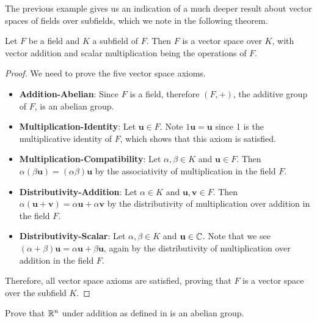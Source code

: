 The previous example gives us an indication of a much deeper result about vector spaces of fields over subfields, which we note in the following theorem.

\begin{theorem}\label{thrm-field-is-vector-space}
    Let $F$ be a field and $K$ a subfield of $F$. Then $F$ is a vector space over $K$, with vector addition and scalar multiplication being the operations of $F$.
\end{theorem}
\begin{proof}
    We need to prove the five vector space axioms.
    \begin{itemize}
        \item \textbf{Addition-Abelian}: Since $F$ is a field, therefore $(F, +)$, the additive group of $F$, is an abelian group.

        \item \textbf{Multiplication-Identity}: Let $\textbf{u} \in F$. Note $1\textbf{u} = \textbf{u}$ since 1 is the multiplicative identity of $F$, which shows that this axiom is satisfied.

        \item \textbf{Multiplication-Compatibility}: Let $\alpha, \beta \in K$ and $\textbf{u} \in F$. Then $\alpha(\beta\textbf{u}) = (\alpha\beta)\textbf{u}$ by the associativity of multiplication in the field $F$.

        \item \textbf{Distributivity-Addition}: Let $\alpha \in K$ and $\textbf{u}, \textbf{v} \in F$. Then $\alpha(\textbf{u} + \textbf{v}) = \alpha\textbf{u} + \alpha\textbf{v}$ by the distributivity of multiplication over addition in the field $F$.

        \item \textbf{Distributivity-Scalar}: Let $\alpha, \beta \in K$ and $\textbf{u} \in \mathbb{C}$. Note that we see $(\alpha+\beta)\textbf{u} = \alpha\textbf{u} + \beta\textbf{u}$, again by the distributivity of multiplication over addition in the field $F$.
    \end{itemize}

    Therefore, all vector space axioms are satisfied, proving that $F$ is a vector space over the subfield $K$.
\end{proof}

\begin{exercise}\label{exercise-R^n-is-abelian-group}
    Prove that $\mathbb{R}^n$ under addition as defined in  is an abelian group.
\end{exercise}

